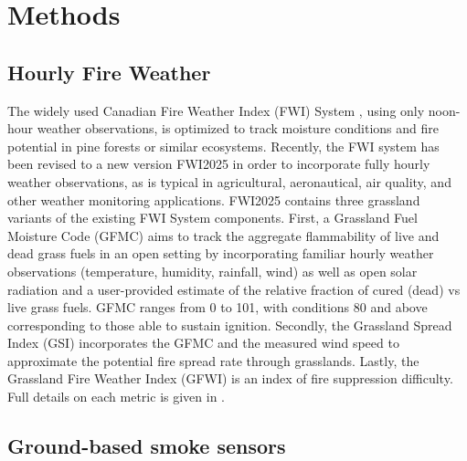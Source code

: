 \documentclass[fire,article,submit,moreauthors]{mdpi}
\begin{document}
\section{Methods}\label{methods}

\subsection{Hourly Fire Weather}\label{hourly-fire-weather}

The widely used Canadian Fire Weather Index (FWI) System
\citep{vanwagner1987}, using only noon-hour weather observations, is
optimized to track moisture conditions and fire potential in pine
forests or similar ecosystems. Recently, the FWI system has been revised
to a new version FWI2025
\citep{canadianforestservicefiredangergroup2025} in order to incorporate
fully hourly weather observations, as is typical in agricultural,
aeronautical, air quality, and other weather monitoring applications.
FWI2025 contains three grassland variants of the existing FWI System
components. First, a Grassland Fuel Moisture Code (GFMC) aims to track
the aggregate flammability of live and dead grass fuels in an open
setting by incorporating familiar hourly weather observations
(temperature, humidity, rainfall, wind) as well as open solar radiation
and a user-provided estimate of the relative fraction of cured (dead) vs
live grass fuels. GFMC ranges from 0 to 101, with conditions 80 and
above corresponding to those able to sustain ignition. Secondly, the
Grassland Spread Index (GSI) incorporates the GFMC and the measured wind
speed to approximate the potential fire spread rate through grasslands.
Lastly, the Grassland Fire Weather Index (GFWI) is an index of fire
suppression difficulty. Full details on each metric is given in
\citep{canadianforestservicefiredangergroup2025}.

\subsection{Ground-based smoke
sensors}\label{ground-based-smoke-sensors}
\end{document}
